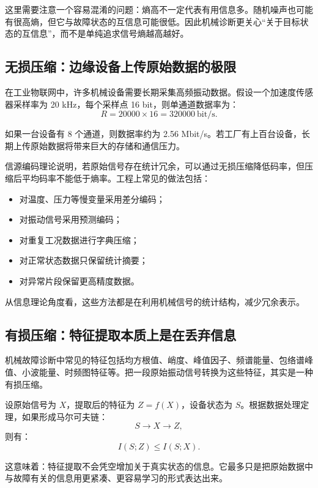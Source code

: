 \documentclass[UTF8,a4paper,12pt]{ctexart}
\begin{document}
这里需要注意一个容易混淆的问题：熵高不一定代表有用信息多。随机噪声也可能有很高熵，但它与故障状态的互信息可能很低。因此机械诊断更关心“关于目标状态的互信息”，而不是单纯追求信号熵越高越好。

\subsection{无损压缩：边缘设备上传原始数据的极限}

在工业物联网中，许多机械设备需要长期采集高频振动数据。假设一个加速度传感器采样率为 20 kHz，每个采样点 16 bit，则单通道数据率为：
\begin{equation}
R=20000\times 16=320000\ \text{bit/s}.
\end{equation}

如果一台设备有 8 个通道，则数据率约为 2.56 Mbit/s。若工厂有上百台设备，长期上传原始数据将带来巨大的存储和通信压力。

信源编码理论说明，若原始信号存在统计冗余，可以通过无损压缩降低码率，但压缩后平均码率不能低于熵率。工程上常见的做法包括：
\begin{itemize}
  \item 对温度、压力等慢变量采用差分编码；
  \item 对振动信号采用预测编码；
  \item 对重复工况数据进行字典压缩；
  \item 对正常状态数据只保留统计摘要；
  \item 对异常片段保留更高精度数据。
\end{itemize}

从信息理论角度看，这些方法都是在利用机械信号的统计结构，减少冗余表示。

\subsection{有损压缩：特征提取本质上是在丢弃信息}

机械故障诊断中常见的特征包括均方根值、峭度、峰值因子、频谱能量、包络谱峰值、小波能量、时频图特征等。把一段原始振动信号转换为这些特征，其实是一种有损压缩。

设原始信号为 $X$，提取后的特征为 $Z=f(X)$，设备状态为 $S$。根据数据处理定理，如果形成马尔可夫链：
\begin{equation}
S \rightarrow X \rightarrow Z,
\end{equation}
则有：
\begin{equation}
I(S;Z)\le I(S;X).
\end{equation}

这意味着：特征提取不会凭空增加关于真实状态的信息。它最多只是把原始数据中与故障有关的信息用更紧凑、更容易学习的形式表达出来。
\end{document}
